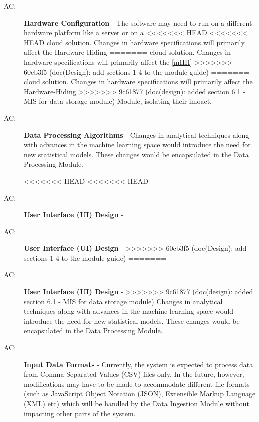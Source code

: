 \documentclass[12pt, titlepage]{article}
\newcounter{acnum}
\newcommand{\actheacnum}{AC\theacnum}
\begin{document}
\begin{description}
  \item[ \actheacnum \label{acHardware}:] \textbf{Hardware Configuration} - 
  The software may need to run on a different hardware platform like a server or on a 
<<<<<<< HEAD
<<<<<<< HEAD
  cloud solution. Changes in hardware specifications will primarily affect the Hardware-Hiding 
=======
  cloud solution. Changes in hardware specifications will primarily affect the \ref{mHH} 
>>>>>>> 60cb3f5 (doc(Design): add sections 1-4 to the module guide)
=======
  cloud solution. Changes in hardware specifications will primarily affect the Hardware-Hiding 
>>>>>>> 9c61877 (doc(design): added section 6.1 - MIS for data storage module)
  Module, isolating their imoact.
  
  \item[ \actheacnum \label{acProcessing}:] \textbf{Data Processing Algorithms} - 
  Changes in analytical techniques along with advances in the machine learning space would
  introduce the need for new statistical models. These changes would be encapsulated in the
  Data Processing Module.

<<<<<<< HEAD
<<<<<<< HEAD
  \item[ \actheacnum \label{acInterface}:] \textbf{User Interface (UI) Design} - 
=======
  \item[ \actheacnum \label{acUI}:] \textbf{User Interface (UI) Design} - 
>>>>>>> 60cb3f5 (doc(Design): add sections 1-4 to the module guide)
=======
  \item[ \actheacnum \label{acInterface}:] \textbf{User Interface (UI) Design} - 
>>>>>>> 9c61877 (doc(design): added section 6.1 - MIS for data storage module)
  Changes in analytical techniques along with advances in the machine learning space would
  introduce the need for new statistical models. These changes would be encapsulated in the
  Data Processing Module.

  \item[ \actheacnum \label{acInput}:] \textbf{Input Data Formats} - 
  Currently, the system is expected to process data from Comma Separated Values (CSV) files only.
  In the future, however, modifications may have to be made to accommodate different file 
  formats (such as JavaScript Object Notation (JSON), Extensible Markup Language (XML) etc)
  which will be handled by the Data Ingestion Module without impacting other parts of the system.


\end{description}
\end{document}
